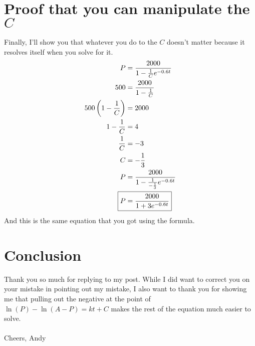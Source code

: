 \documentclass[12pt]{article}
\begin{document}
\section{Proof that you can manipulate the \texorpdfstring{$C$}{Lg}}
Finally, I'll show you that whatever you do to the $C$ doesn't matter because it resolves itself when you solve for it.
\begin{align}
P&=\frac{2000}{1-\frac{1}{C}e^{-0.6t}}\\
500&=\frac{2000}{1-\frac{1}{C}}\\
500\left(1-\frac{1}{C}\right)&=2000\\
1-\frac{1}{C}&=4\\
\frac{1}{C}&=-3\\
C&=-\frac{1}{3}\\
P&=\frac{2000}{1-\frac{1}{-\frac{1}{3}}e^{-0.6t}}\\
\Aboxed{P&=\frac{2000}{1+3e^{-0.6t}}}
\end{align}
And this is the same equation that you got using the formula.
\section{Conclusion}
Thank you so much for replying to my post. While I did want to correct you on your mistake in pointing out my mistake, I also want to thank you for showing me that pulling out the negative at the point of $\ln\left(P\right)-\ln\left(A-P\right)=kt+C$ makes the rest of the equation much easier to solve.
\paragraph{}
Cheers,
Andy
\end{document}
